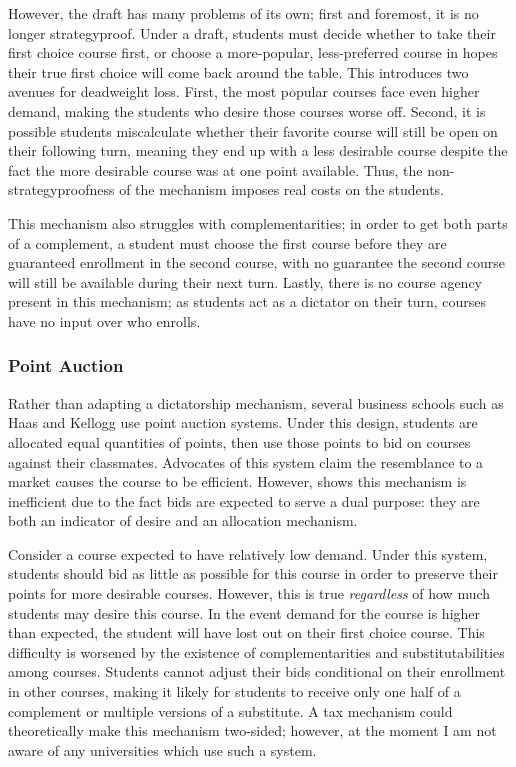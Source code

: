 \documentclass{article}
\begin{document}
However, the draft has many problems of its own; first and foremost, it is no longer strategyproof. Under a draft, students must decide whether to take their first choice course first, or choose a more-popular, less-preferred course in hopes their true first choice will come back around the table. This introduces two avenues for deadweight loss. First, the most popular courses face even higher demand, making the students who desire those courses worse off. Second, it is possible students miscalculate whether their favorite course will still be open on their following turn, meaning they end up with a less desirable course despite the fact the more desirable course was at one point available. Thus, the non-strategyproofness of the mechanism imposes real costs on the students.

This mechanism also struggles with complementarities; in order to get both parts of a complement, a student must choose the first course before they are guaranteed enrollment in the second course, with no guarantee the second course will still be available during their next turn. Lastly, there is no course agency present in this mechanism; as students act as a dictator on their turn, courses have no input over who enrolls.

\subsubsection{Point Auction}

Rather than adapting a dictatorship mechanism, several business schools such as Haas and Kellogg use point auction systems. Under this design, students are allocated equal quantities of points, then use those points to bid on courses against their classmates. Advocates of this system claim the resemblance to a market causes the course to be efficient. However, \textcite{sonmez2010} shows this mechanism is inefficient due to the fact bids are expected to serve a dual purpose: they are both an indicator of desire and an allocation mechanism. 

Consider a course expected to have relatively low demand. Under this system, students should bid as little as possible for this course in order to preserve their points for more desirable courses. However, this is true \emph{regardless} of how much students may desire this course. In the event demand for the course is higher than expected, the student will have lost out on their first choice course. This difficulty is worsened by the existence of complementarities and substitutabilities among courses. Students cannot adjust their bids conditional on their enrollment in other courses, making it likely for students to receive only one half of a complement or multiple versions of a substitute. A tax mechanism could theoretically make this mechanism two-sided; however, at the moment I am not aware of any universities which use such a system. 
\end{document}
